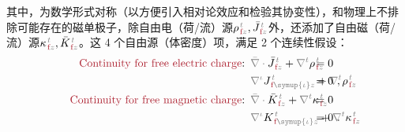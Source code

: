 其中，为数学形式对称（以方便引入相对论效应和检验其协变性\cite{lakhtakiaCovariancesInvariancesMaxwell1995,chen-zhuChenZhuxieUndergraduate_courses2024}），和物理上不排除可能存在的磁单极子，除自由电（荷/流）源${\rho}^{\;\!\mathcolor{gray}{t}}_{\;\!\textcolor{Maroon}{\text{f}}\mathcolor{gray}{z}}, \bar{J}^{\;\!\mathcolor{gray}{t}}_{\;\!\textcolor{Maroon}{\text{f}}\mathcolor{gray}{z}}$外，还添加了自由磁（荷/流）源${\kappa}^{\;\!\mathcolor{gray}{t}}_{\;\!\textcolor{Maroon}{\text{f}}\mathcolor{gray}{z}}, \bar{K}^{\;\!\mathcolor{gray}{t}}_{\;\!\textcolor{Maroon}{\text{f}}\mathcolor{gray}{z}}$\cite{lakhtakiaCovariancesInvariancesMaxwell1995}。这 4 个自由源（体密度）项，满足 2 个连续性假设\cite{mackayElectromagneticAnisotropyBianisotropy2019,lakhtakiaCovariancesInvariancesMaxwell1995,chen-zhuChenZhuxieUndergraduate_courses2024}：
\begin{subequations} \label{eq:Div-em-f}
	\abovedisplayskip=-4pt
	\belowdisplayskip=10pt
\begin{align}
	\textcolor{Maroon}{\text{Continuity for free electric charge}}\text{:}&\hspace{0.5em} \mathcolor{gray}{\bar{\nabla} \cdot} \bar{J}^{\;\!\mathcolor{gray}{t}}_{\;\!\textcolor{Maroon}{\text{f}}\mathcolor{gray}{z}} + \mathcolor{gray}{\nabla^t} {\rho}^{\;\!\mathcolor{gray}{t}}_{\;\!\textcolor{Maroon}{\text{f}}\mathcolor{gray}{z}} \hspace{-5.3em} &&= 0 \label{eq:Div-e-f} \\ 
	&\hspace{0.5em} \mathcolor{gray}{\nabla^\iota} J^{\;\!\mathcolor{gray}{t}}_{\;\!\textcolor{Maroon}{\text{f}} \mathcolor{gray}{\symup{\iota}}\mathcolor{gray}{z}} + \mathcolor{gray}{\nabla^t} {\rho}^{\;\!\mathcolor{gray}{t}}_{\;\!\textcolor{Maroon}{\text{f}}\mathcolor{gray}{z}} \hspace{-5.3em} &&= 0~, \label{eq:div-e-f} \\ 
	\textcolor{Maroon}{\text{Continuity for free magnetic charge}}\text{:}&\hspace{0.5em} \mathcolor{gray}{\bar{\nabla} \cdot} \bar{K}^{\;\!\mathcolor{gray}{t}}_{\;\!\textcolor{Maroon}{\text{f}}\mathcolor{gray}{z}} + \mathcolor{gray}{\nabla^t} {\kappa}^{\;\!\mathcolor{gray}{t}}_{\;\!\textcolor{Maroon}{\text{f}}\mathcolor{gray}{z}} \hspace{-5.3em} &&= 0 \label{eq:Div-m-f} \\
	&\hspace{0.5em} \mathcolor{gray}{\nabla^\iota} K^{\;\!\mathcolor{gray}{t}}_{\;\!\textcolor{Maroon}{\text{f}} \mathcolor{gray}{\symup{\iota}}\mathcolor{gray}{z}} + \mathcolor{gray}{\nabla^t} {\kappa}^{\;\!\mathcolor{gray}{t}}_{\;\!\textcolor{Maroon}{\text{f}}\mathcolor{gray}{z}} \hspace{-5.3em} &&= 0~. \label{eq:div-m-f}
\end{align}
\end{subequations}
